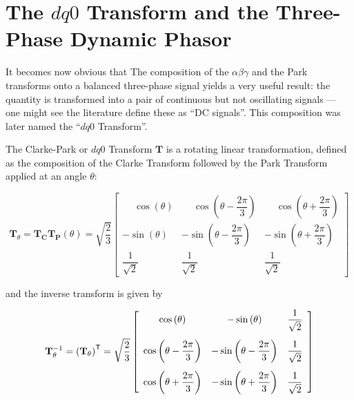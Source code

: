 \section{The $dq0$ Transform and the Three-Phase Dynamic Phasor} %

	It becomes now obvious that The composition of the $\alpha\beta\gamma$ and the Park transforms onto a balanced three-phase signal yields a very useful result: the quantity is transformed into a pair of continuous but not oscillating signals — one might see the literature define these as ``DC signals''. This composition was later named the ``$dq0$ Transform''.

\begin{definition}\label{def:dq0_transform} The Clarke-Park or $dq0$ Transform $\mathbf{T}$ is a rotating linear transformation, defined as the composition of the Clarke Transform followed by the Park Transform applied at an angle $\theta$:

\begin{equation} \mathbf{T}_\theta = \mathbf{T_C}\mathbf{T_P}\left(\theta\right) = \sqrt{\dfrac{2}{3}}
\left[\begin{array}{ccc}
\phantom{-}\cos\left(\theta\right) & \phantom{-}\cos\left(\theta - \dfrac{2\pi}{3}\right) & \phantom{-}\cos\left(\theta + \dfrac{2\pi}{3}\right) \\[5mm]
-\sin\left(\theta\right) & -\sin\left(\theta - \dfrac{2\pi}{3}\right) & -\sin\left(\theta + \dfrac{2\pi}{3}\right) \\[5mm]
\dfrac{1}{\sqrt{2}} & \dfrac{1}{\sqrt{2}} & \dfrac{1}{\sqrt{2}} 
\end{array}\right]
 \end{equation}

	\noindent and the inverse transform is given by

\begin{equation} \mathbf{T}^{-1}_\theta = \left(\mathbf{T}_\theta\right)^{\mathsf{T}} = 
\sqrt{\dfrac{2}{3}}\left[\begin{array}{ccc}
\cos\left(\theta\right)                   & -\sin\left(\theta\right)                   & \dfrac{1}{\sqrt{2}} \\[5mm]
\cos\left(\theta - \dfrac{2\pi}{3}\right) & -\sin\left(\theta - \dfrac{2\pi}{3}\right) & \dfrac{1}{\sqrt{2}} \\[5mm] 
\cos\left(\theta + \dfrac{2\pi}{3}\right) & -\sin\left(\theta + \dfrac{2\pi}{3}\right) & \dfrac{1}{\sqrt{2}}
\end{array}\right]
 \end{equation}
\end{definition}

